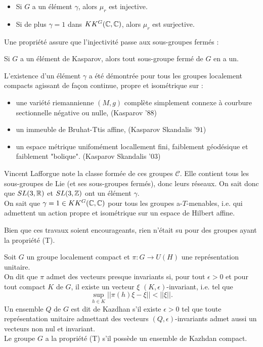 \begin{Res}[Tu] 
\begin{itemize}
\item Si $G$ a un élément $\gamma$, alors $\mu_r$ est injective.
\item Si de plus $\gamma = 1$ dans $KK^G(\mathbb C,\mathbb C)$, alors $\mu_r$ est surjective.\\
\end{itemize}
\end{Res}

Une propriété assure que l'injectivité passe aux sous-groupes fermés :\\
\begin{prop}
Si $G$ a un élément de Kasparov, alors tout sous-groupe fermé de $G$ en a un.\\
\end{prop}

\begin{Res}
L'existence d'un élément $\gamma$ a été démontrée pour tous les groupes localement compacts agissant de façon continue, propre et isométrique sur :
\begin{itemize}
\item une variété riemannienne $(M,g)$ complète simplement connexe à courbure sectionnelle négative ou nulle, (Kasparov '$88$)
\item un immeuble de Bruhat-Ttis affine, (Kasparov Skandalis '$91$)
\item un espace métrique unifomément locallement fini, faiblement géodésique et faiblement "bolique". (Kasparov Skandalis '$03$)
\end{itemize}
Vincent Lafforgue note la classe formée de ces groupes $\mathcal C$. Elle contient tous les sous-groupes de Lie (et ses sous-groupes fermés), donc leurs réseaux. On sait donc que $SL(3,\mathbb R)$ et $SL(3,\mathbb Z)$ ont un élément $\gamma$.\\

On sait que $\gamma = 1\in KK^G(\mathbb C,\mathbb C)$ pour tous les groupes a-$T$-menables, i.e. qui admettent un action propre et isométrique sur un espace de Hilbert affine. \\
\end{Res}

Bien que ces travaux soient encourageants, rien n'était su pour des groupes ayant la propriété (T).\\

\begin{definition}
Soit $G$ un groupe localement compact et $\pi : G\rightarrow U(H)$ une représentation unitaire. \\
On dit que $\pi$ admet des vecteurs presque invariants si, pour tout $\epsilon>0$ et pour tout compact $K$ de $G$, il existe un vecteur $\xi$ $(K,\epsilon)$-invariant, i.e. tel que 
\[\sup_{h\in K}||\pi(h)\xi - \xi||<||\xi||.\]
Un ensemble $Q$ de $G$ est dit de Kazdhan s'il existe $\epsilon>0$ tel que toute représentation unitaire admettant des vecteurs $(Q,\epsilon)$-invariants admet aussi un vecteurs non nul et invariant. \\
Le groupe $G$ a la propriété (T) s'il possède un ensemble de Kazhdan compact.\\
\end{definition}


